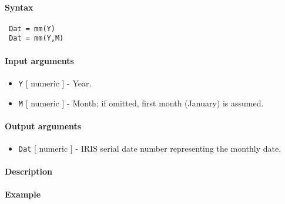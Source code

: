 


	\paragraph{Syntax}
 
 \begin{verbatim}
 Dat = mm(Y)
 Dat = mm(Y,M)
 \end{verbatim}
 
 \paragraph{Input arguments}
 
 \begin{itemize}
 \item
   \texttt{Y} {[} numeric {]} - Year.
 \item
   \texttt{M} {[} numeric {]} - Month; if omitted, first month (January)
   is assumed.
 \end{itemize}
 
 \paragraph{Output arguments}
 
 \begin{itemize}
 \item
   \texttt{Dat} {[} numeric {]} - IRIS serial date number representing
   the monthly date.
 \end{itemize}
 
 \paragraph{Description}
 
 \paragraph{Example}


